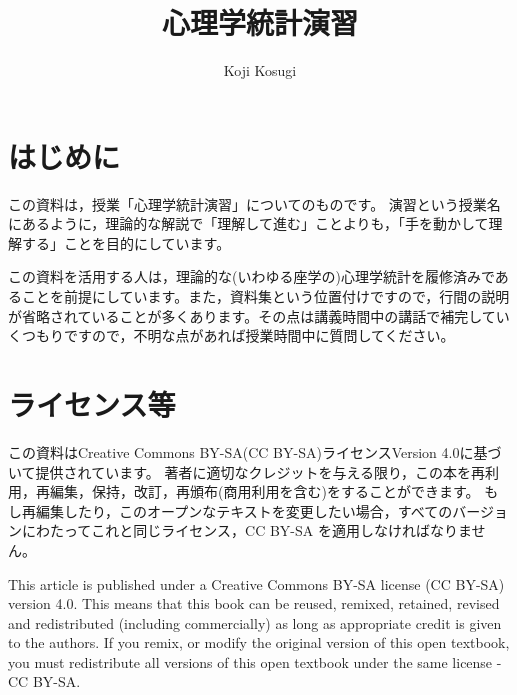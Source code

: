 \documentclass[
  a4paper,
]{ltjsbook}
\title{心理学統計演習}
\author{Koji Kosugi}
\date{}
\renewcommand*\contentsname{Table of contents}
\newcommand\contentsname{Table of contents}
\begin{document}
\maketitle
\ifdefined\Shaded\renewenvironment{Shaded}{\begin{tcolorbox}[boxrule=0pt, sharp corners, interior hidden, borderline west={3pt}{0pt}{shadecolor}, breakable, enhanced, frame hidden]}{\end{tcolorbox}}\fi

\renewcommand*\contentsname{Table of contents}
{
\hypersetup{linkcolor=}
\setcounter{tocdepth}{2}
\tableofcontents
}

\hypertarget{ux306fux3058ux3081ux306b}{%
\chapter{はじめに}\label{ux306fux3058ux3081ux306b}}

この資料は，授業「心理学統計演習」についてのものです。
演習という授業名にあるように，理論的な解説で「理解して進む」ことよりも，「手を動かして理解する」ことを目的にしています。

この資料を活用する人は，理論的な(いわゆる座学の)心理学統計を履修済みであることを前提にしています。また，資料集という位置付けですので，行間の説明が省略されていることが多くあります。その点は講義時間中の講話で補完していくつもりですので，不明な点があれば授業時間中に質問してください。


\hypertarget{ux30e9ux30a4ux30bbux30f3ux30b9ux7b49}{%
\chapter{ライセンス等}\label{ux30e9ux30a4ux30bbux30f3ux30b9ux7b49}}

この資料はCreative Commons BY-SA(CC BY-SA)ライセンスVersion
4.0に基づいて提供されています。
著者に適切なクレジットを与える限り，この本を再利用，再編集，保持，改訂，再頒布(商用利用を含む)をすることができます。
もし再編集したり，このオープンなテキストを変更したい場合，すべてのバージョンにわたってこれと同じライセンス，CC
BY-SA を適用しなければなりません。

This article is published under a Creative Commons BY-SA license (CC
BY-SA) version 4.0. This means that this book can be reused, remixed,
retained, revised and redistributed (including commercially) as long as
appropriate credit is given to the authors. If you remix, or modify the
original version of this open textbook, you must redistribute all
versions of this open textbook under the same license - CC BY-SA.
\end{document}

